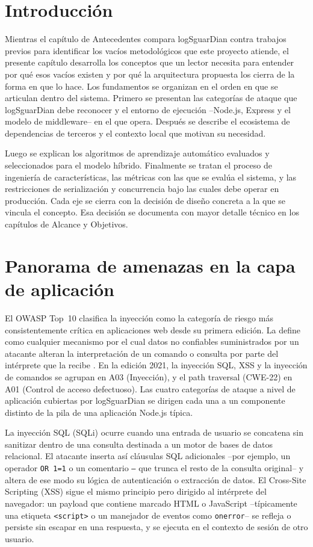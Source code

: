 \section{Introducción}

Mientras el capítulo de Antecedentes compara logSguarDian contra trabajos previos para identificar los vacíos metodológicos que este proyecto atiende, el presente capítulo desarrolla los conceptos que un lector necesita para entender por qué esos vacíos existen y por qué la arquitectura propuesta los cierra de la forma en que lo hace. Los fundamentos se organizan en el orden en que se articulan dentro del sistema. Primero se presentan las categorías de ataque que logSguarDian debe reconocer y el entorno de ejecución --Node.js, Express y el modelo de middleware-- en el que opera. Después se describe el ecosistema de dependencias de terceros y el contexto local que motivan su necesidad.

Luego se explican los algoritmos de aprendizaje automático evaluados y seleccionados para el modelo híbrido. Finalmente se tratan el proceso de ingeniería de características, las métricas con las que se evalúa el sistema, y las restricciones de serialización y concurrencia bajo las cuales debe operar en producción. Cada eje se cierra con la decisión de diseño concreta a la que se vincula el concepto. Esa decisión se documenta con mayor detalle técnico en los capítulos de Alcance y Objetivos.

\section{Panorama de amenazas en la capa de aplicación}

El OWASP Top~10 clasifica la inyección como la categoría de riesgo más consistentemente crítica en aplicaciones web desde su primera edición. La define como cualquier mecanismo por el cual datos no confiables suministrados por un atacante alteran la interpretación de un comando o consulta por parte del intérprete que la recibe \parencite{owasp2021}. En la edición 2021, la inyección SQL, XSS y la inyección de comandos se agrupan en A03 (Inyección), y el path traversal (CWE-22) en A01 (Control de acceso defectuoso). Las cuatro categorías de ataque a nivel de aplicación cubiertas por logSguarDian se dirigen cada una a un componente distinto de la pila de una aplicación Node.js típica.

La inyección SQL (SQLi) ocurre cuando una entrada de usuario se concatena sin sanitizar dentro de una consulta destinada a un motor de bases de datos relacional. El atacante inserta así cláusulas SQL adicionales --por ejemplo, un operador \texttt{OR 1=1} o un comentario \texttt{--} que trunca el resto de la consulta original-- y altera de ese modo su lógica de autenticación o extracción de datos. El Cross-Site Scripting (XSS) sigue el mismo principio pero dirigido al intérprete del navegador: un payload que contiene marcado HTML o JavaScript --típicamente una etiqueta \texttt{<script>} o un manejador de eventos como \texttt{onerror}-- se refleja o persiste sin escapar en una respuesta, y se ejecuta en el contexto de sesión de otro usuario.

